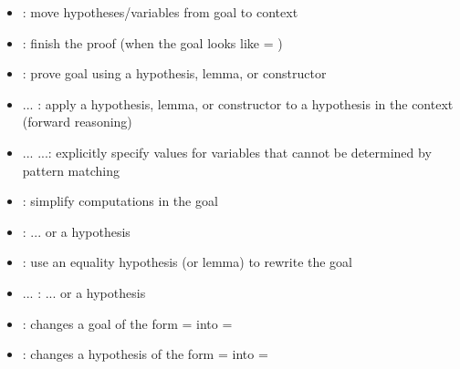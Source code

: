 \documentclass[12pt]{report}
\begin{document}
\begin{itemize}
\item  {}: 
        move hypotheses/variables from goal to context 



\item  {}:
        finish the proof (when the goal looks like  = )



\item  {}:
        prove goal using a hypothesis, lemma, or constructor



\item  {}...  : 
        apply a hypothesis, lemma, or constructor to a hypothesis in
        the context (forward reasoning)



\item  {}... ...:
        explicitly specify values for variables that cannot be
        determined by pattern matching



\item  {}:
        simplify computations in the goal 



\item  {}  :
        ... or a hypothesis 



\item  {}:
        use an equality hypothesis (or lemma) to rewrite the goal 



\item  {} ...  :
        ... or a hypothesis 



\item  {}:
        changes a goal of the form = into =



\item  {}  :
        changes a hypothesis of the form = into =




\end{itemize}
\end{document}
